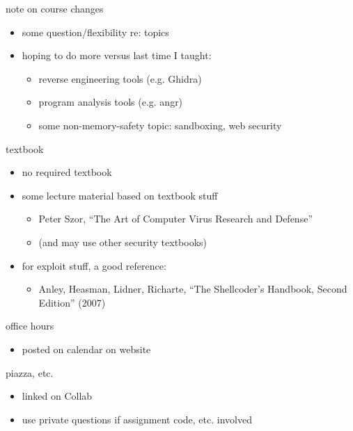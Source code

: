 \begin{frame}{note on course changes}
    \begin{itemize}
    \item some question/flexibility re: topics
    \vspace{.5cm}
    \item hoping to do more versus last time I taught:
        \begin{itemize}
        \item reverse engineering tools (e.g. Ghidra)
        \item program analysis tools (e.g. angr)
        \item some non-memory-safety topic: sandboxing, web security
        \end{itemize}
    \end{itemize}
\end{frame}

\begin{frame}{textbook}
\begin{itemize}
    \item no required textbook
    \vspace{.5cm}
    \item some lecture material based on textbook stuff
        \begin{itemize}
        \item Peter Szor, ``The Art of Computer Virus Research and Defense''
        \item (and may use other security textbooks)
        \end{itemize}
    \item for exploit stuff, a good reference:
        \begin{itemize}
        \item Anley, Heasman, Lidner, Richarte, ``The Shellcoder's Handbook, Second Edition'' (2007)
        \end{itemize}
    \end{itemize}
\end{frame}

\begin{frame}{office hours}
    \begin{itemize}
    \item posted on calendar on website
    \end{itemize}
\end{frame}

\begin{frame}{piazza, etc.}
    \begin{itemize}
    \item linked on Collab
    \vspace{.5cm}
    \item use private questions if assignment code, etc. involved
    \end{itemize}
\end{frame}
